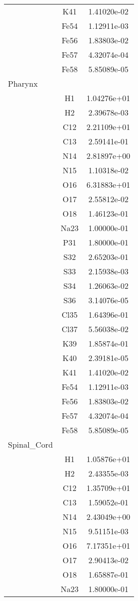 \begin{centering}
\begin{longtable}{l c c}
& K41 & 1.41020e-02 \\ 
& Fe54 & 1.12911e-03 \\ 
& Fe56 & 1.83803e-02 \\ 
& Fe57 & 4.32074e-04 \\ 
& Fe58 & 5.85089e-05 \\ 
\hline
Pharynx & & \\
\hline
& H1 & 1.04276e+01 \\ 
& H2 & 2.39678e-03 \\ 
& C12 & 2.21109e+01 \\ 
& C13 & 2.59141e-01 \\ 
& N14 & 2.81897e+00 \\ 
& N15 & 1.10318e-02 \\ 
& O16 & 6.31883e+01 \\ 
& O17 & 2.55812e-02 \\ 
& O18 & 1.46123e-01 \\ 
& Na23 & 1.00000e-01 \\ 
& P31 & 1.80000e-01 \\ 
& S32 & 2.65203e-01 \\ 
& S33 & 2.15938e-03 \\ 
& S34 & 1.26063e-02 \\ 
& S36 & 3.14076e-05 \\ 
& Cl35 & 1.64396e-01 \\ 
& Cl37 & 5.56038e-02 \\ 
& K39 & 1.85874e-01 \\ 
& K40 & 2.39181e-05 \\ 
& K41 & 1.41020e-02 \\ 
& Fe54 & 1.12911e-03 \\ 
& Fe56 & 1.83803e-02 \\ 
& Fe57 & 4.32074e-04 \\ 
& Fe58 & 5.85089e-05 \\ 
\hline
Spinal\_Cord & & \\
\hline
& H1 & 1.05876e+01 \\ 
& H2 & 2.43355e-03 \\ 
& C12 & 1.35709e+01 \\ 
& C13 & 1.59052e-01 \\ 
& N14 & 2.43049e+00 \\ 
& N15 & 9.51151e-03 \\ 
& O16 & 7.17351e+01 \\ 
& O17 & 2.90413e-02 \\ 
& O18 & 1.65887e-01 \\ 
& Na23 & 1.80000e-01 \\ 

\end{longtable}
\end{centering}
